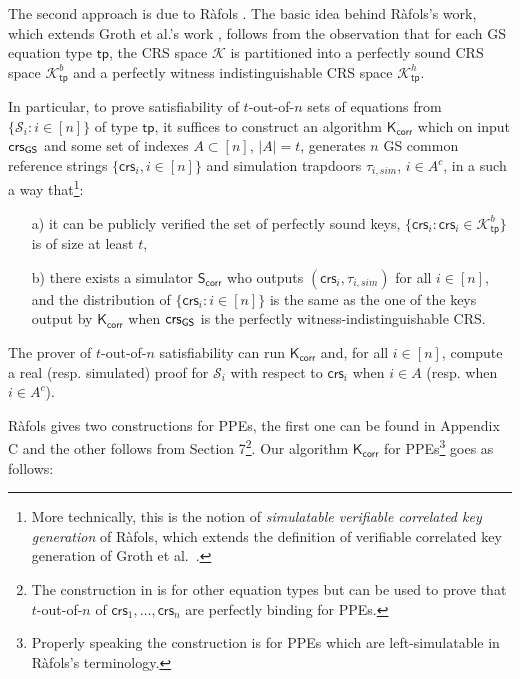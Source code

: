 The second approach is due to R\`afols \cite{TCC:Rafols15}. The basic idea behind R\`afols's work, which extends Groth et al.'s work \cite{C:GroOstSah06}, follows from the observation that for each GS equation type 
$\mathsf{tp}$,  the CRS space $\mathcal{K}$ is partitioned into a perfectly sound CRS space $\mathcal{K}^b_\mathsf{tp}$ and a perfectly witness indistinguishable CRS space $\mathcal{K}^{h}_\mathsf{tp}$.

In particular, to prove satisfiability of $t$-out-of-$n$ sets of equations from $\{\mathcal{S}_i:i\in[n]\}$ of type $\mathsf{tp}$, it suffices to construct an algorithm $\mathsf{K}_{\mathsf{corr}}$ which on input
$\mathsf{crs}_{{\mathsf{GS}}}$ and some set of indexes $A \subset [n]$, $|A|=t$, generates $n$ GS common reference strings 
$\{\mathsf{crs}_i, i \in [n]\}$ and simulation trapdoors $\tau_{i,sim}$, $i \in A^c$, in a such a way that\footnote{More technically, this is the notion of \textit{simulatable verifiable correlated key generation} of R\`afols, which extends the definition of verifiable correlated key generation of Groth et al.~\cite{C:GroOstSah06}.}:
\begin{itemize}
\item[a)] it can be publicly verified the set of perfectly sound keys, 
$\{\mathsf{crs}_i : \mathsf{crs}_i \in \mathcal{K}_{\mathsf{tp}}^{b}\}$ is of size at least $t$,
\item [b)] there exists a simulator $\mathsf{S}_{\mathsf{corr}}$ who outputs $(\mathsf{crs}_i,\tau_{i,sim})$ for all $i \in [n]$, and the distribution of $\{\mathsf{crs}_i : i \in [n]\}$ is the same as the one of the keys  output by $\mathsf{K}_{\mathsf{corr}}$ when $\mathsf{crs}_{{\mathsf{GS}}}$ is the perfectly witness-indistinguishable CRS.
\end{itemize}
The prover of $t$-out-of-$n$ satisfiability can run $\mathsf{K}_{\mathsf{corr}}$ and, for all $i \in [n]$, compute a real (resp. simulated) proof for 
$\mathcal{S}_i$ with respect to $\mathsf{crs}_i$
when $i \in A$ (resp. when $i \in A^c$).

R\`afols gives two constructions for PPEs, the first one can be found in Appendix C and the other follows from Section 7\footnote{The construction in \cite[Section~7]{TCC:Rafols15} is for other equation types but can be used to prove that $t$-out-of-$n$ of $\mathsf{crs}_1,\ldots,\mathsf{crs}_n$ are perfectly binding for PPEs.
}. 
Our algorithm $\mathsf{K}_\mathsf{corr}$ for PPEs\footnote{Properly speaking the construction is for PPEs which are left-simulatable in R\`afols's terminology.} goes as follows:

